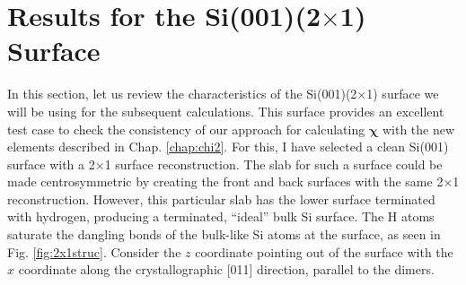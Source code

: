 
\section{Results for the \texorpdfstring{Si(001)(2$\times$1)}{Si(001)(2x1)}
Surface}\label{sec:Si2x1results}

In this section, let us review the characteristics of the Si(001)(2$\times$1)
surface we will be using for the subsequent calculations. This surface provides
an excellent test case to check the consistency of our approach for calculating
$\boldsymbol{\chi}$ with the new elements described in Chap. \ref{chap:chi2}.
For this, I have selected a clean Si(001) surface with a 2$\times$1 surface
reconstruction. The slab for such a surface could be made centrosymmetric by
creating the front and back surfaces with the same 2$\times$1 reconstruction.
However, this particular slab has the lower surface terminated with hydrogen,
producing a terminated, ``ideal'' bulk Si surface. The H atoms saturate the
dangling bonds of the bulk-like Si atoms at the surface, as seen in Fig.
\ref{fig:2x1struc}. Consider the $z$ coordinate pointing out of the surface with
the $x$ coordinate along the crystallographic [011] direction, parallel to the
dimers.

